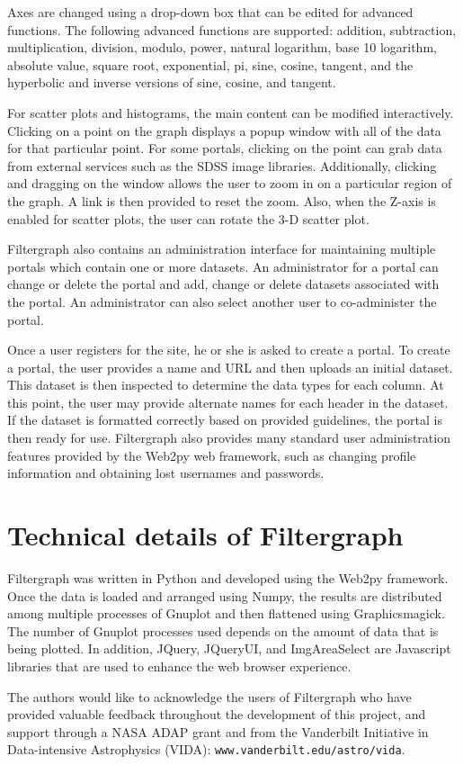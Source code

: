 \documentclass[11pt,twoside]{article}
\begin{document}
Axes are changed using a drop-down box that can be edited for advanced functions. The
following advanced functions are supported: addition, subtraction, multiplication, division, modulo, power, natural logarithm, base 10 logarithm, absolute value, square root, exponential, pi, sine, cosine, tangent, and the hyperbolic and inverse versions of sine, cosine, and tangent.

For scatter plots and histograms, the main content can be modified
interactively. Clicking on a point on the graph displays a popup window with all
of the data for that particular point. For some portals, clicking on the
point can grab data from external services such as the SDSS image libraries. Additionally, clicking and dragging on the window allows the user to zoom in on a particular region of the graph. A link is then provided to reset the zoom. Also, when the Z-axis is enabled for scatter plots, the user can rotate
the 3-D scatter plot.

Filtergraph also contains an administration interface for maintaining multiple portals which contain one
or more datasets. An administrator for a portal can change or delete the
portal and add, change or delete datasets associated with the portal. An
administrator can also select another user to co-administer the portal.

Once a user registers for the site, he or she is asked to create a portal. To
create a portal, the user provides a name and URL and then uploads an
initial dataset. This dataset is then inspected to determine the data
types for each column. At this point, the user may provide alternate names
for each header in the dataset. If the dataset is formatted correctly based on provided guidelines,
the portal is then ready for use. Filtergraph also provides many standard user administration features provided by the Web2py web framework, such as changing profile information and obtaining
lost usernames and passwords.



\section{Technical details of Filtergraph}
Filtergraph was written in Python and developed using the Web2py framework. Once the data is loaded and arranged using Numpy, the results are distributed among multiple processes of Gnuplot and then flattened using Graphicsmagick. The number of Gnuplot processes used depends on the amount of data that is being plotted. In addition, JQuery, JQueryUI, and ImgAreaSelect are Javascript libraries that are used to enhance the web browser experience. 

\acknowledgements 
The authors would like to acknowledge the users of Filtergraph who have provided valuable feedback throughout the development of this project, and support 
through a NASA ADAP grant and from the Vanderbilt Initiative in Data-intensive
Astrophysics (VIDA): {\tt www.vanderbilt.edu/astro/vida}. 

%
\end{document}
